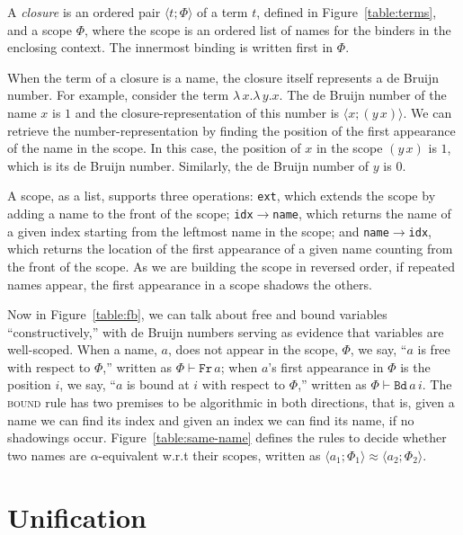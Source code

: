 \documentclass[a4paper,UKenglish]{lipics-v2016}
\newcommand{\clos}[2] {
  \langle #1; #2 \rangle
}
\newcommand{\aeq}[4] {
  \clos{#1}{#2} \approx \clos{#3}{#4}
}
\newcommand*{\transname}[1]{\textsc{#1}}
\begin{document}


\begin{definition}
  A \emph{closure} is an ordered pair $\clos{t}{\Phi}$ of a term $t$,
  defined in Figure~\ref{table:terms}, and a scope $\Phi$, where the
  scope is an ordered list of names for the binders in the enclosing
  context. The innermost binding is written first in $\Phi$.
\end{definition}

When the term of a closure is a name, the closure itself represents a
de Bruijn number.  For example, consider the term
$\lambda\,x.\lambda\,y.x$. The de Bruijn number of the name $x$ is $1$
and the closure-representation of this number is $\clos{x}{(y\,x)}$.
We can retrieve the number-representation by finding the position of
the first appearance of the name in the scope. In this case, the
position of $x$ in the scope $(y\,x)$ is $1$, which is its de Bruijn
number. Similarly, the de Bruijn number of $y$ is $0$.

A scope, as a list, supports three operations: \texttt{ext},
which extends the scope by adding a name to the front of the scope;
\texttt{idx$\rightarrow$name}, which returns the name of a given index
starting from the leftmost name in the scope; and
\texttt{name$\rightarrow$idx}, which returns the location of the first
appearance of a given name counting from the front of the scope.  As we
are building the scope in reversed order, if repeated names appear, the
first appearance in a scope shadows the others.

Now in Figure~\ref{table:fb}, we can talk about free and bound
variables ``constructively,'' with de Bruijn numbers serving as
evidence that variables are well-scoped.  When a name, $a$, does not
appear in the scope, $\Phi$, we say, ``$a$ is free with respect to
$\Phi$,'' written as $\Phi \vdash \texttt{Fr}\, a$; when $a$'s first
appearance in $\Phi$ is the position $i$, we say, ``$a$ is bound at
$i$ with respect to $\Phi$,'' written as $\Phi \vdash \texttt{Bd}\,
a\,i$.  The \transname{bound} rule has two premises to be algorithmic
in both directions, that is, given a name we can find its index and
given an index we can find its name, if no shadowings occur.
Figure~\ref{table:same-name} defines the rules to decide whether two
names are $\alpha$-equivalent w.r.t their scopes, written as
$\aeq{a_1}{\Phi_1}{a_2}{\Phi_2}$.

\pagebreak

\section{Unification}
\end{document}
